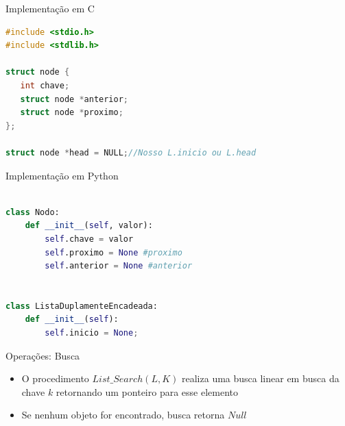 \documentclass{beamer}
\begin{document}
\begin{frame}[fragile]{Implementação em C}

\centering\footnotesize
\begin{lstlisting}[language=C]
#include <stdio.h>
#include <stdlib.h>

struct node {
   int chave;
   struct node *anterior;
   struct node *proximo;
};

struct node *head = NULL;//Nosso L.inicio ou L.head

\end{lstlisting}
\end{frame}


\begin{frame}[fragile]{Implementação em Python}

\centering\footnotesize
\begin{lstlisting}[language=Python]

class Nodo:
    def __init__(self, valor):
        self.chave = valor
        self.proximo = None #proximo
        self.anterior = None #anterior


class ListaDuplamenteEncadeada:
    def __init__(self):
        self.inicio = None;

\end{lstlisting}
\end{frame}


\begin{frame}{Operações: Busca}
\begin{itemize}
 \item O procedimento $List\_Search(L,K)$ realiza uma busca linear em busca da chave $k$ retornando um ponteiro para esse elemento
 \item Se nenhum objeto for encontrado, busca retorna $Null$
\end{itemize}


\end{frame}
\end{document}
